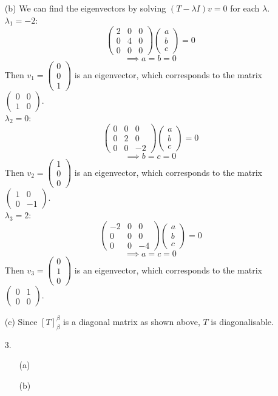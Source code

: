 \documentclass{article}
\begin{document}
\begin{itemize}
\begin{itemize}
              \item [(b)] We can find the eigenvectors by solving $(T-\lambda I)v=0$ for each $\lambda$.\\$\lambda_1=-2$:\[\begin{pmatrix}2&0&0\\0&4&0\\0&0&0\end{pmatrix}\begin{pmatrix}a\\b\\c\end{pmatrix}=0\]\[\implies a=b=0\]Then $v_1=\begin{pmatrix}0\\0\\1\end{pmatrix}$ is an eigenvector, which corresponds to the matrix $\begin{pmatrix}0&0\\1&0\end{pmatrix}$.\\$\lambda_2=0$:\[\begin{pmatrix}0&0&0\\0&2&0\\0&0&-2\end{pmatrix}\begin{pmatrix}a\\b\\c\end{pmatrix}=0\]\[\implies b=c=0\]Then $v_2=\begin{pmatrix}1\\0\\0\end{pmatrix}$ is an eigenvector, which corresponds to the matrix $\begin{pmatrix}1&0\\0&-1\end{pmatrix}$.\\$\lambda_3=2$:\[\begin{pmatrix}-2&0&0\\0&0&0\\0&0&-4\end{pmatrix}\begin{pmatrix}a\\b\\c\end{pmatrix}=0\]\[\implies a=c=0\]Then $v_3=\begin{pmatrix}0\\1\\0\end{pmatrix}$ is an eigenvector, which corresponds to the matrix $\begin{pmatrix}0&1\\0&0\end{pmatrix}$.
              \item [(c)] Since $[T]_\beta^\beta$ is a diagonal matrix as shown above, $T$ is diagonalisable.
          \end{itemize}
\end{itemize}
\newpage
\begin{itemize}
    \item [3.]
          \begin{itemize}
              \item [(a)]
              \item [(b)]
          \end{itemize}
\end{itemize}
\end{document}
